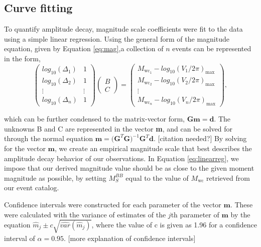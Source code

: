 \documentclass{gji}
\begin{document}
\subsection{Curve fitting}
To quantify amplitude decay, magnitude scale coefficients were fit to the data using a simple linear regression. Using the general form of the magnitude equation, given by Equation \ref{eq:mag},a collection of $n$ events can be represented in the form, 
\begin{equation}
	\begin{pmatrix}
		log_{10}(\Delta_{1}) & 1 \\
		log_{10}(\Delta_{2}) & 1 \\
		\vdots  & \vdots \\
		log_{10}(\Delta_{n}) & 1 
	\end{pmatrix}
	\begin{pmatrix}
		{B}\\
		{C}
	\end{pmatrix}
	=
	\begin{pmatrix}
		M_{\text{wc}_1} - log_{10}({V_1}/{2\pi})_{\text{max}} \\
		M_{\text{wc}_2} - log_{10}({V_2}/{2\pi})_{\text{max}} \\
		\vdots  \\
		M_{\text{wc}_n} - log_{10}({V_n}/{2\pi})_{\text{max}}
	\end{pmatrix},
	\label{eq:linearreg}
\end{equation}

\noindent which can be further condensed to the matrix-vector form, $\mathbf{Gm = d}$. The unknowns B and C are represented in the vector {\bfseries m}, and can be solved for through the normal equation $\mathbf{m} = \mathbf{(G}^{T}\mathbf{G})^{-1}\mathbf{G}^T\mathbf{d}$. [citation needed?]
By solving for the vector $\mathbf{m}$, we create an empirical magnitude scale that best describes the amplitude decay behavior of our observations. In Equation \ref{eq:linearreg}, we impose that our derived magnitude value should be as close to the given moment magnitude as possible, by setting $M_S^{BB}$ equal to the value of $M_\text{wc}$ retrieved from our event catalog. 

Confidence intervals were constructed for each parameter of the vector $\mathbf{m}$. These were calculated with the variance of estimates of the $j$th parameter of $\mathbf{m}$ by the equation $\hat{m}_j \pm c \sqrt{\hat{var}(\hat{m}_j)}$, where the value of c is given as 1.96 for a confidence interval of $\alpha = 0.95$. [more explanation of confidence intervals]
\end{document}
